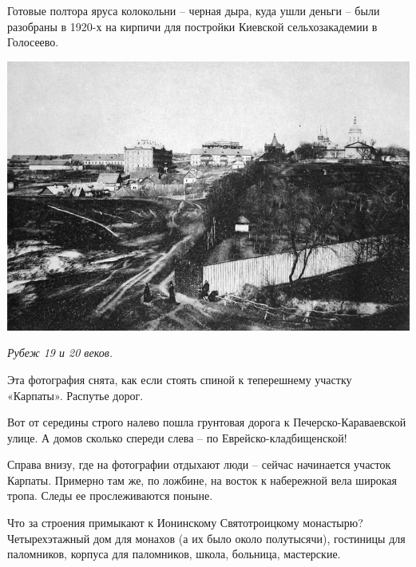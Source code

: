 Готовые полтора яруса колокольни – черная дыра, куда ушли деньги – были разобраны в 1920-х на кирпичи для постройки Киевской сельхозакадемии в Голосеево.


\vspace*{\fill}

\begin{center}
\includegraphics[width=\linewidth]{chast-vosp/zver/karavay.jpg}

\textit{Рубеж 19 и 20 веков.}
\end{center}

\vspace*{\fill}


Эта фотография снята, как если стоять спиной к теперешнему участку «Карпаты». Распутье дорог.

Вот от середины строго налево пошла грунтовая дорога к Печерско-Кара\-ваевской улице. А домов сколько спереди  слева – по Еврейско-кладбищенской!

Справа внизу, где на фотографии отдыхают люди – сейчас начинается участок Карпаты. Примерно там же, по ложбине, на восток к набережной вела широкая тропа. Следы ее прослеживаются поныне.

Что за строения примыкают к Ионинскому Святотроицкому монастырю? Четырехэтажный дом для монахов (а их было около полутысячи), гостиницы для паломников,  корпуса для паломников, школа, больница, мастерские.

\newpage


